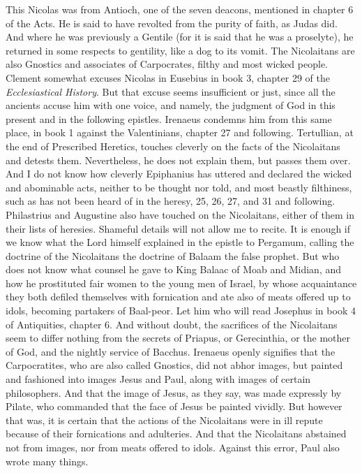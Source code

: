 This Nicolas was from Antioch, one of the seven deacons, mentioned in chapter 6 of the Acts. He is said to have revolted from the purity of faith, as Judas did. And where he was previously a Gentile (for it is said that he was a proselyte), he returned in some respects to gentility, like a dog to its vomit. The Nicolaitans are also Gnostics and associates of Carpocrates, filthy and most wicked people. Clement somewhat excuses Nicolas in Eusebius in book 3, chapter 29 of the \textit{Ecclesiastical History}. But that excuse seems insufficient or just, since all the ancients accuse him with one voice, and namely, the judgment of God in this present and in the following epistles. Irenaeus condemns him from this same place, in book 1 against the Valentinians, chapter 27 and following. Tertullian, at the end of Prescribed Heretics, touches cleverly on the facts of the Nicolaitans and detests them. Nevertheless, he does not explain them, but passes them over. And I do not know how cleverly Epiphanius has uttered and declared the wicked and abominable acts, neither to be thought nor told, and most beastly filthiness, such as has not been heard of in the heresy, 25, 26, 27, and 31 and following. Philastrius and Augustine also have touched on the Nicolaitans, either of them in their lists of heresies. Shameful details will not allow me to recite. It is enough if we know what the Lord himself explained in the epistle to Pergamum, calling the doctrine of the Nicolaitans the doctrine of Balaam the false prophet. But who does not know what counsel he gave to King Balaac of Moab and Midian, and how he prostituted fair women to the young men of Israel, by whose acquaintance they both defiled themselves with fornication and ate also of meats offered up to idols, becoming partakers of Baal-peor. Let him who will read Josephus in book 4 of Antiquities, chapter 6. And without doubt, the sacrifices of the Nicolaitans seem to differ nothing from the secrets of Priapus, or Gerecinthia, or the mother of God, and the nightly service of Bacchus. Irenaeus openly signifies that the Carpocratites, who are also called Gnostics, did not abhor images, but painted and fashioned into images Jesus and Paul, along with images of certain philosophers. And that the image of Jesus, as they say, was made expressly by Pilate, who commanded that the face of Jesus be painted vividly. But however that was, it is certain that the actions of the Nicolaitans were in ill repute because of their fornications and adulteries. And that the Nicolaitans abstained not from images, nor from meats offered to idols. Against this error, Paul also wrote many things.

